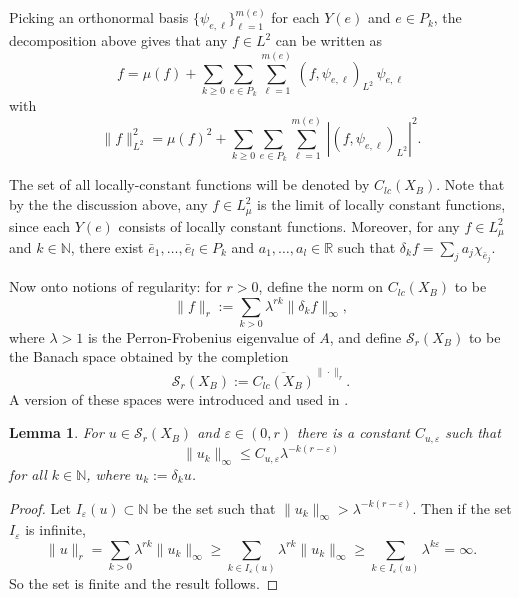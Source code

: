 \documentclass[12pt]{amsart}
\theoremstyle{plain}
\newtheorem{lemma}{Lemma}[section]
\theoremstyle{definition}
\begin{document}
Picking an orthonormal basis $\{\psi_{e,\ell}\}_{\ell=1}^{m(e)}$ for each $Y(e)$ and $e\in P_k$, the decomposition above gives that any $f\in L^2$ can be written as
$$f = \mu(f) + \sum_{k\geq 0 }\sum_{e\in P_k} \sum_{\ell=1}^{m(e)} \, (f,\psi_{e,\ell})_{L^2} \, \psi_{e,\ell}$$
with
\begin{equation}
\label{eqn:L2norm}
\|f\|^2_{L^2} = \mu(f)^2 + \sum_{k\geq 0 }\sum_{e\in P_k} \sum_{\ell=1}^{m(e)} \, |(f,\psi_{e,\ell})_{L^2}|^2 .
\end{equation}

The set of all locally-constant functions will be denoted by $C_{lc}(X_B)$. Note that by the the discussion above, any $f\in L^2_\mu$ is the limit of locally constant functions, since each $Y(e)$ consists of locally constant functions. Moreover, for any $f\in L^2_\mu$ and $k\in\mathbb{N}$, there exist $\bar{e}_1,\dots ,\bar{e}_l\in P_k$ and $a_1,\dots, a_l \in\mathbb{R}$ such that $\delta_k f = \sum_j a_j \chi_{\bar{e}_j}$. 

Now onto notions of regularity: for $r>0$, define the norm on $C_{lc}(X_B)$ to be
$$\|f\|_r := \sum_{k>0} \lambda^{rk} \|\delta_k f\|_\infty,$$
where $\lambda>1$ is the Perron-Frobenius eigenvalue of $A$, and define $\mathcal{S} _r(X_B)$ to be the Banach space obtained by the completion
$$\mathcal{S} _r(X_B):= \overline{C_{lc}(X_B)}^{\|\cdot \|_r }.$$
A version of these spaces were introduced and used in \cite{T:Transverse, T:CohEq}.
\begin{lemma}
\label{lem:cnsts}
For $u\in \mathcal{S}_r(X_B)$ and $\varepsilon\in (0,r)$ there is a constant $C_{u,\varepsilon}$ such that
$$\|u_k\|_\infty\leq C_{u,\varepsilon} \lambda^{-k(r-\varepsilon)}$$
for all $k\in\mathbb{N}$, where $u_k:= \delta_k u$.
\end{lemma}
\begin{proof}
    Let $I_\varepsilon(u)\subset \mathbb{N}$ be the set such that $\|u_k\|_\infty> \lambda^{-k(r-\varepsilon)}$. Then if the set $I_{\varepsilon}$ is infinite,
    $$\|u\|_r = \sum_{k>0}\lambda^{rk}\|u_k\|_\infty \geq \sum_{k\in I_{\varepsilon}(u)}\lambda^{rk}\|u_k\|_\infty \geq \sum_{k\in I_{\varepsilon}(u)}\lambda^{k\varepsilon} = \infty. $$
    So the set is finite and the result follows.
\end{proof}
\end{document}
